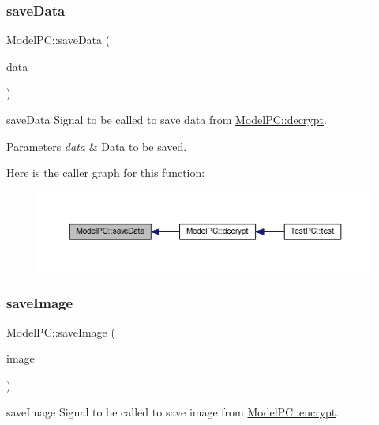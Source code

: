 \subsubsection{\texorpdfstring{save\+Data}{saveData}}
{\footnotesize\ttfamily Model\+P\+C\+::save\+Data (\begin{DoxyParamCaption}\item[{Q\+Byte\+Array}]{data }\end{DoxyParamCaption})\hspace{0.3cm}{\ttfamily [signal]}}



save\+Data Signal to be called to save data from \mbox{\hyperlink{class_model_p_c_af1f0b21565bf39808c4cdd448fad0ea8}{Model\+P\+C\+::decrypt}}. 


\begin{DoxyParams}{Parameters}
{\em data} & Data to be saved. \\
\hline
\end{DoxyParams}
Here is the caller graph for this function\+:
\nopagebreak
\begin{figure}[H]
\begin{center}
\leavevmode
\includegraphics[width=350pt]{class_model_p_c_a67c4fd6db2cd4a3bb23a2fc48f7cceff_icgraph}
\end{center}
\end{figure}
\mbox{\label{class_model_p_c_a5af79bd5fd50d7be0646778bc99413b9}} 
\subsubsection{\texorpdfstring{save\+Image}{saveImage}}
{\footnotesize\ttfamily Model\+P\+C\+::save\+Image (\begin{DoxyParamCaption}\item[{Q\+Image $\ast$}]{image }\end{DoxyParamCaption})\hspace{0.3cm}{\ttfamily [signal]}}



save\+Image Signal to be called to save image from \mbox{\hyperlink{class_model_p_c_a8ef76567bc0c0307b4e2547c46536e51}{Model\+P\+C\+::encrypt}}. 


